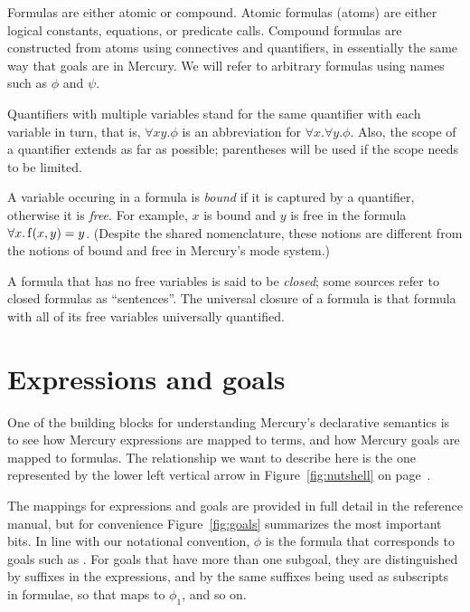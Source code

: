 Formulas are either atomic or compound.
Atomic formulas (atoms\label{gi:atom2}) are either
logical constants, equations, or predicate calls.
Compound formulas are constructed from atoms
using connectives and quantifiers,
in essentially the same way that goals are in Mercury.
We will refer to arbitrary formulas
using names such as $\phi$ and $\psi$.

Quantifiers with multiple variables stand for
the same quantifier with each variable in turn,
that is, $\forall x y.\phi$
is an abbreviation for $\forall x.\forall y.\phi$.
Also, the scope of a quantifier extends as far as possible;
parentheses will be used if the scope needs to be limited.

A variable occuring in a formula is \emph{bound\label{gi:bound}}
if it is captured by a quantifier,
otherwise it is \emph{free\label{gi:free}}.
For example,
$x$ is bound and $y$ is free
in the formula $\forall x. \operatorname{f}(x, y) = y$.
(Despite the shared nomenclature,
these notions are different from the notions of bound and free
in Mercury's mode system.)

A formula that has no free variables
is said to be \emph{closed\label{gi:closed-formula}};
some sources refer to closed formulas as ``sentences''.
The universal closure of a formula is that formula with
all of its free variables universally quantified.


\section{Expressions and goals}
\label{sec:goals}

One of the building blocks
for understanding Mercury's declarative semantics
is to see how Mercury expressions are mapped to terms,
and how Mercury goals are mapped to formulas.
The relationship we want to describe here is
the one represented by the lower left vertical arrow
in Figure~\ref{fig:nutshell} on page~\pageref{fig:nutshell}.

The mappings for expressions and goals
are provided in full detail in the reference manual,
but for convenience
Figure~\ref{fig:goals} summarizes the most important bits.
In line with our notational convention,
$\phi$ is the formula that corresponds to goals such as .
For goals that have more than one subgoal,
they are distinguished by suffixes in the expressions,
and by the same suffixes being used as subscripts in formulae,
so that  maps to $\phi_1$, and so on.

